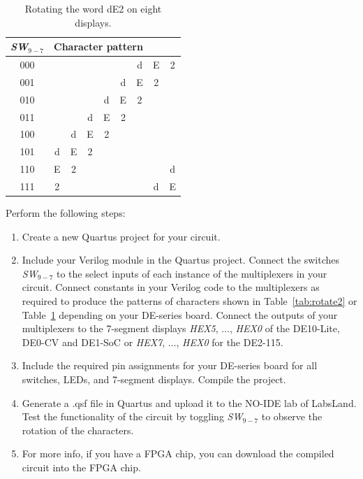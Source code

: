 \documentclass[epsfig,10pt,fullpage]{article}
\newcommand{\CommonDocsPath}{../../../common/docs}
\begin{document}
\begin{table}[ht]
\begin{minipage}[t]{12.5 cm}
\begin{center}
\begin{tabular}{c|cccccccc}
{\it SW}$_{9-7}$ & \multicolumn{6}{c}{Character pattern} \\
\hline
{\rule[0mm]{0mm}{5mm}000 } & & & & & & d & E & 2 \\ 
001 & & & & & d & E & 2 & \\
010 & & & & d & E & 2 & & \\
011 & & & d & E & 2 & & & \\
100 & & d & E & 2 & & & & \\
101 & d & E & 2 & & & & &  \\
110 & E & 2 & & & & & & d \\
111 & 2 & & & & & & d & E \\
\end{tabular}
\end{center}
\end{minipage}
\caption{Rotating the word dE2 on eight displays.}
\label{tab:rotate3}
\end{table}

Perform the following steps:
\begin{enumerate}
\item Create a new Quartus project for your circuit.
\item Include your Verilog module in the Quartus project. Connect the switches 
{\it SW}$_{9-7}$ to the select inputs of each instance of the 
multiplexers in your circuit. Connect constants in your Verilog code to the multiplexers 
as required to produce the patterns of characters shown in Table~\ref{tab:rotate2} or 
Table~\ref{tab:rotate3} depending on your DE-series board.
Connect the outputs of your multiplexers to the 7-segment displays {\it HEX5}, $\ldots$, 
{\it HEX0} of the DE10-Lite, DE0-CV and DE1-SoC or {\it HEX7}, $\ldots$, 
{\it HEX0} for the DE2-115.
\item Include the required pin assignments for your DE-series board for all switches, LEDs, 
and 7-segment displays. Compile the project.
\item Generate a .qsf file in Quartus and upload it to the NO-IDE lab of LabsLand. Test the functionality of the 
circuit by toggling {\it SW}$_{9-7}$ to observe the rotation of the characters.
\item For more info, if you have a FPGA chip, you can download the compiled circuit into the FPGA chip.
\end{enumerate}



\end{document}
